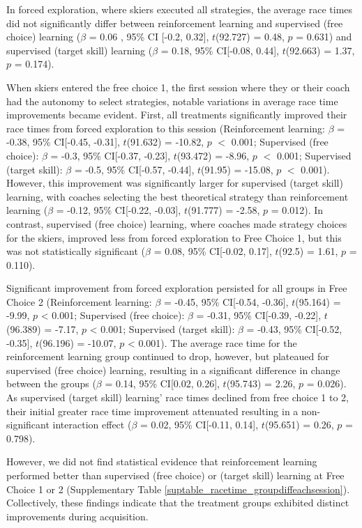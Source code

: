 \documentclass[pdflatex,sn-mathphys-num]{sn-jnl}%
\theoremstyle{thmstyleone}%
\theoremstyle{thmstyletwo}%
\theoremstyle{thmstylethree}%
\begin{document}
In forced exploration, where skiers executed all strategies, the average race times did not significantly differ between reinforcement learning and supervised (free choice) learning ($\beta$ = 0.06 , 95\% CI [-0.2, 0.32], $t$(92.727) = 0.48, $p$ = 0.631) and supervised (target skill) learning ($\beta$ = 0.18, 95\% CI[-0.08, 0.44], $t$(92.663) = 1.37, $p$ = 0.174). 

When skiers entered the free choice 1, the first session where they or their coach had the autonomy to select strategies, notable variations in average race time improvements became evident. First, all treatments significantly improved their race times from forced exploration to this session (Reinforcement learning: $\beta$ = -0.38, 95\% CI[-0.45, -0.31], $t$(91.632) = -10.82, $p$ $<$ 0.001; Supervised (free choice): $\beta$ = -0.3, 95\% CI[-0.37, -0.23], $t$(93.472) = -8.96, $p$ $<$ 0.001; Supervised (target skill): $\beta$ = -0.5, 95\% CI[-0.57, -0.44], $t$(91.95) = -15.08, $p$ $<$ 0.001). However, this improvement was significantly larger for supervised (target skill) learning, with coaches selecting the best theoretical strategy than reinforcement learning ($\beta$ = -0.12, 95\% CI[-0.22, -0.03], $t$(91.777) = -2.58, $p$ = 0.012). In contrast, supervised (free choice) learning, where coaches made strategy choices for the skiers, improved less from forced exploration to Free Choice 1, but this was not statistically significant ($\beta$ = 0.08, 95\% CI[-0.02, 0.17], $t$(92.5) = 1.61, $p$ = 0.110).

Significant improvement from forced exploration persisted for all groups in Free Choice 2 (Reinforcement learning: $\beta$ = -0.45, 95\% CI[-0.54, -0.36], $t$(95.164) = -9.99, $p$ < 0.001; Supervised (free choice): $\beta$ = -0.31, 95\% CI[-0.39, -0.22], $t$(96.389) = -7.17, $p$ < 0.001; Supervised (target skill): $\beta$ = -0.43, 95\% CI[-0.52, -0.35], $t$(96.196) = -10.07, $p$ < 0.001). The average race time for the reinforcement learning group continued to drop, however, but plateaued for supervised (free choice) learning, resulting in a significant difference in change between the groups ($\beta$ = 0.14, 95\% CI[0.02, 0.26], $t$(95.743) = 2.26, $p$ = 0.026). As supervised (target skill) learning' race times declined from free choice 1 to 2, their initial greater race time improvement attenuated resulting in a non-significant interaction effect ($\beta$ = 0.02, 95\% CI[-0.11, 0.14], $t$(95.651) = 0.26, $p$ = 0.798).

However, we did not find statistical evidence that reinforcement learning performed better than supervised (free choice) or (target skill) learning at Free Choice 1 or 2 (Supplementary Table \ref{suptable_racetime_groupdiffeachsession}).
Collectively, these findings indicate that the treatment groups exhibited distinct improvements during acquisition.
\end{document}

